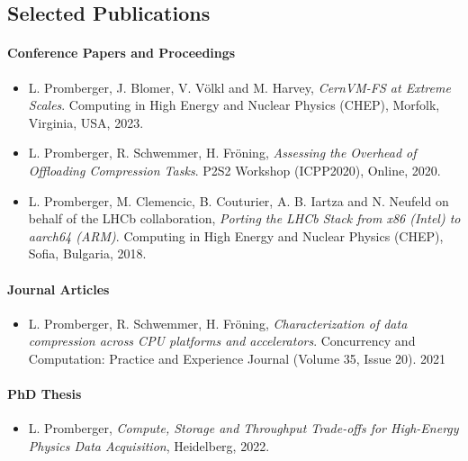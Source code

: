 \subsection*{Selected Publications}

\paragraph{Conference Papers and Proceedings}

\begin{itemize}

\item[] L. Promberger, J. Blomer, V. Völkl and M. Harvey, \emph{CernVM-FS at Extreme Scales}. Computing in High Energy and Nuclear Physics (CHEP), Morfolk, Virginia, USA, 2023.

\item[] L. Promberger, R. Schwemmer, H. Fröning, \emph{Assessing the Overhead of Offloading Compression Tasks}. P2S2 Workshop (ICPP2020), Online, 2020.

\item[] L. Promberger, M. Clemencic, B. Couturier, A. B. Iartza and N. Neufeld on behalf of the LHCb collaboration, \emph{Porting the LHCb Stack from x86 (Intel) to aarch64 (ARM)}. Computing in High Energy and Nuclear Physics (CHEP), Sofia, Bulgaria, 2018.


\end{itemize}

\paragraph{Journal Articles}

\begin{itemize}

\item[] L. Promberger, R. Schwemmer, H. Fröning,
\emph{Characterization of data compression across CPU platforms and accelerators}.
Concurrency and Computation: Practice and Experience Journal (Volume 35, Issue 20). 2021

\end{itemize}

\paragraph{PhD Thesis}

\begin{itemize}

\item[] L. Promberger, \emph{Compute, Storage and Throughput Trade-offs for High-Energy Physics Data Acquisition}, Heidelberg, 2022.

\end{itemize}